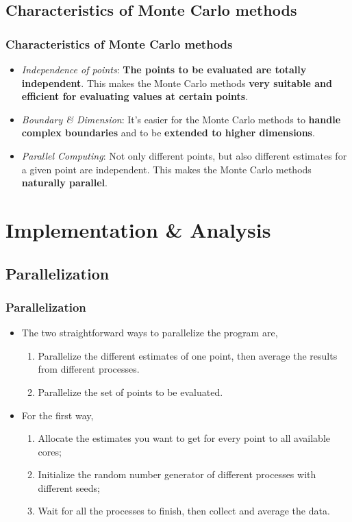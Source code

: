\documentclass{beamer}
\begin{document}

\subsection{Characteristics of Monte Carlo methods}

\begin{frame}
\frametitle{Characteristics of Monte Carlo methods}
\begin{itemize}
\item \emph{Independence of points}: \textbf{The points to be evaluated are totally independent}. This makes the Monte Carlo methods \textbf{very suitable and efficient for evaluating values at certain points}.
\item \emph{Boundary \& Dimension}: It's easier for the Monte Carlo methods to \textbf{handle complex boundaries} and to be \textbf{extended to higher dimensions}.
\item \emph{Parallel Computing}: Not only different points, but also different estimates for a given point are independent. This makes the Monte Carlo methods \textbf{naturally parallel}.
\end{itemize}
\end{frame}


\section{Implementation \& Analysis}


\subsection{Parallelization}

\begin{frame}
\frametitle{Parallelization}
\begin{itemize}
\item The two straightforward ways to parallelize the program are,
\begin{enumerate}
    \item Parallelize the different estimates of one point, then average the results from different processes.
    \item Parallelize the set of points to be evaluated.
\end{enumerate}
\item For the first way,
\begin{enumerate}
    \item Allocate the estimates you want to get for every point to all available cores;
    \item Initialize the random number generator of different processes with different seeds;
    \item Wait for all the processes to finish, then collect and average the data.
\end{enumerate}
\end{itemize}
\end{frame}
\end{document}
